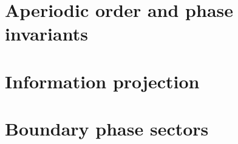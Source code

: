 \part{Aperiodic order and phase invariants}




\part{Information projection}



\part{Boundary phase sectors}

